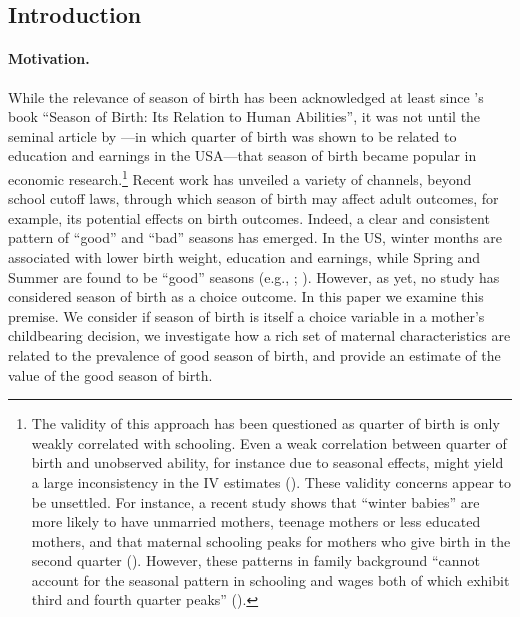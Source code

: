 \documentclass[a4paper, 11.5 pt]{article}
\theoremstyle{plain}
\begin{document}
\newpage
\begin{doublespace}

\section{Introduction}
\paragraph{Motivation.} While the relevance of season of birth has been acknowledged at least since \citeauthor{Huntington38}'s \citeyear{Huntington38} book ``Season of Birth: Its Relation to Human Abilities'', it was not until the seminal article by \citet{AK1991}---in which quarter of birth was shown to be related to education and earnings in the USA---that season of birth became popular in economic research.\footnote{The validity of this approach has been questioned as quarter of birth is only weakly correlated with schooling. Even a weak correlation between quarter of birth and unobserved ability, for instance due to seasonal effects, might yield a large inconsistency in the IV estimates (\citealp{bound1995problems}). These validity concerns appear to be unsettled. For instance, a recent study shows that ``winter babies'' are more likely to have unmarried mothers, teenage mothers or less educated mothers, and that maternal schooling peaks for mothers who give birth in the second quarter (\citealp{BucklesHungerman2013}). However, these patterns in family background ``cannot account for the seasonal pattern in schooling and wages both of which exhibit third and fourth quarter peaks'' (\citealp{angrist2014mastering}).}  Recent work has unveiled a variety of channels, beyond school cutoff laws, through which season of birth may affect adult outcomes, for example, its potential effects on birth outcomes. Indeed, a clear and consistent pattern of ``good'' and ``bad'' seasons has emerged. In the US, winter months are associated with lower birth weight, education and earnings, while Spring and Summer are found to be ``good'' seasons (e.g., \citealp{BucklesHungerman2013}; \citealp{CS2013}). However, as yet, no study has considered season of birth as a choice outcome.  In this paper we examine this premise.  We consider if season of birth is itself a choice variable in a mother's childbearing decision, we investigate how a rich set of maternal characteristics are related to the prevalence of good season of birth, and provide an estimate of the value of the good season of birth.


\end{doublespace}
\end{document}

